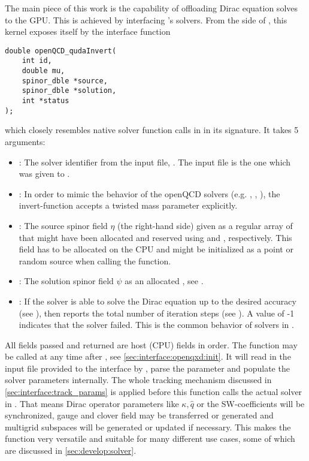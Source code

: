 The main piece of this work is the capability of offloading Dirac equation solves to the GPU.
This is achieved by interfacing \quda's solvers.
From the side of \openqxd, this kernel exposes itself by the interface function
\begin{verbatim}
double openQCD_qudaInvert(
    int id,
    double mu,
    spinor_dble *source,
    spinor_dble *solution,
    int *status
);
\end{verbatim}
which closely resembles native solver function calls in \openqxd in its signature.
It takes \num{5} arguments:
\begin{itemize}
  \item {}: The solver identifier from the input file, \ie {}. The input file is the one which was given to .
  \item {}: In order to mimic the behavior of the openQCD solvers (e.g. , , ), the invert-function accepts a twisted mass parameter  explicitly.
  \item {}: The source spinor field $\eta$ (the right-hand side) given as a regular \openqxd array of  that might have been allocated and reserved using  and , respectively. This field has to be allocated on the CPU and might be initialized as a point or random source when calling the function.
  \item {}: The solution spinor field $\psi$ as an allocated , see .
  \item {}: If the solver is able to solve the Dirac equation up to the desired accuracy (see ), then  reports the total number of iteration steps (see ). A value of -1 indicates that the solver failed. This is the common behavior of solvers in \openqxd.
\end{itemize}

All fields passed and returned are host (CPU) fields in \openqxd order.
The function may be called at any time after , see \cref{sec:interface:openqxd:init}.
It will read in the input file provided to the interface by , parse the parameter and populate the solver parameters internally.
The whole tracking mechanism discussed in \cref{sec:interface:track_params} is applied before this function calls the actual solver in \quda.
That means Dirac operator parameters like $\kappa, \hat{q}$ or the SW-coefficients will be synchronized, gauge and clover field may be transferred or generated and multigrid subspaces will be generated or updated if necessary.
This makes the function very versatile and suitable for many different use cases, some of which are discussed in \cref{sec:develop:solver}.

